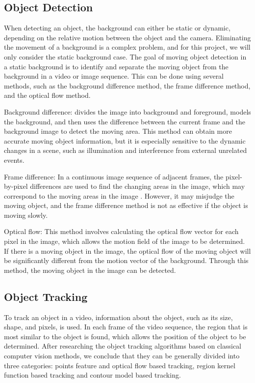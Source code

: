 \documentclass[12pt]{article}
\begin{document}
\subsection*{Object Detection}
When detecting an object, the background can either be static or dynamic, depending on the relative motion between the object and the camera. Eliminating the movement of a background is a complex problem, and for this project, we will only consider the static background case. The goal of moving object detection in a static background is to identify and separate the moving object from the background in a video or image sequence. This can be done using several methods, such as the background difference method, the frame difference method, and the optical flow method.

Background difference: \cite{stauffer1999adaptive} divides the image into background and foreground, models the background, and then uses the difference between the current frame and the background image to detect the moving area. This method can obtain more accurate moving object information, but it is especially sensitive to the dynamic changes in a scene, such as illumination and interference from external unrelated events.

Frame difference: In a continuous image sequence of adjacent frames, the pixel-by-pixel differences are used to find the changing areas in the image, which may correspond to the moving areas in the image \cite{meier1999video}. However, it may misjudge the moving object, and the frame difference method is not as effective if the object is moving slowly.

Optical flow: This method involves calculating the optical flow vector for each pixel in the image, which allows the motion field of the image to be determined. If there is a moving object in the image, the optical flow of the moving object will be significantly different from the motion vector of the  background. Through this method, the moving object in the image can be detected.

\subsection*{Object Tracking}
To track an object in a video, information about the object, such as its size, shape, and pixels, is used. In each frame of the video sequence, the region that is most similar to the object is found, which allows the position of the object to be determined. After researching the object tracking algorithms based on classical computer vision methods, we conclude that they can be generally divided into three categories: points feature and optical flow based tracking, region kernel function based tracking and contour model based tracking.
\end{document}
